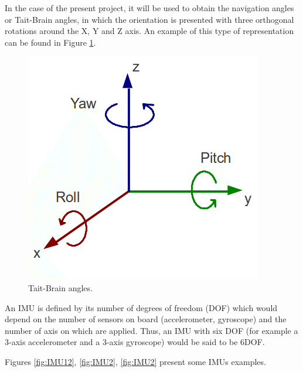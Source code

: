 In the case of the present project, it will be used to obtain the navigation angles or Tait-Brain angles, in which the orientation is presented with three orthogonal rotations around the X, Y and Z axis. An example of this type of representation can be found in Figure \ref{fig:orientacion}.\newline


\begin{figure}[H]
	\center
	\includegraphics[scale=0.5]{imagenes/Balancing_robot/orientacion}
	\caption{Tait-Brain angles.}
	\label{fig:orientacion}
\end{figure}


An IMU is defined by its number of degrees of freedom (DOF) which would depend on the number of sensors on board (accelerometer, gyroscope) and the number of axis on which are applied. Thus, an IMU with six DOF (for example a 3-axis accelerometer and a 3-axis gyroscope) would be said to be 6DOF. \newline

Figures \ref{fig:IMU12}, \ref{fig:IMU2}, \ref{fig:IMU2} present some IMUs examples.

